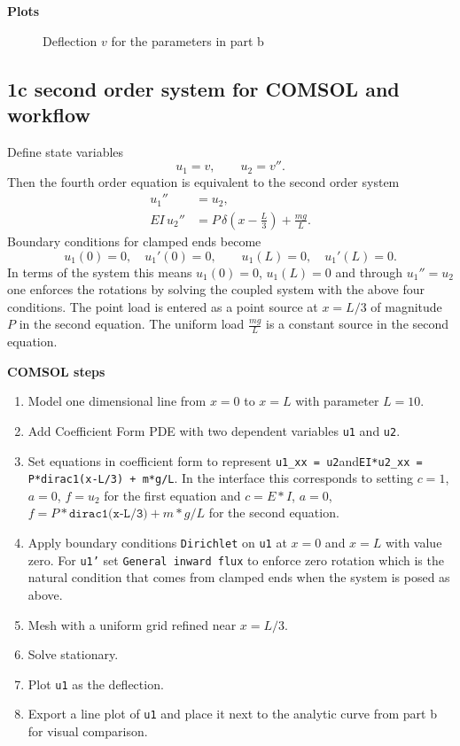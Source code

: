 \documentclass[12pt, a4paper]{article}
\newcommand{\incfig}[1]{%
  \IfFileExists{#1}{\texttt{[image: \#1]}}{%
    \IfFileExists{figs/#1}{\texttt{[image: figs/\#1]}}{%
      \fbox{\rule{0pt}{3cm}\rule{.7\linewidth}{0pt}}}}}
\newcommand{\PlotsHeading}{%
  \FloatBarrier
  \noindent\textbf{Plots}\par\vspace{0.25em}%
}
\begin{document}
\PlotsHeading
\begin{figure}[H]
  \centering
  \incfig{p1b_v.png}
  \caption{Deflection $v$ for the parameters in part b}
\end{figure}
\FloatBarrier

\subsection*{1c  second order system for COMSOL and workflow}

Define state variables
\[
u_{1}=v,\qquad u_{2}=v''.
\]
Then the fourth order equation is equivalent to the second order system
\[
\boxed{
\begin{aligned}
u_{1}'' &= u_{2},\\
E I\,u_{2}'' &= P\,\delta\!\left(x-\frac{L}{3}\right)+\frac{m g}{L}.
\end{aligned}}
\]
Boundary conditions for clamped ends become
\[
u_{1}(0)=0,\quad u_{1}'(0)=0,\qquad
u_{1}(L)=0,\quad u_{1}'(L)=0.
\]
In terms of the system this means $u_{1}(0)=0$, $u_{1}(L)=0$ and through $u_{1}''=u_{2}$ one enforces the rotations by solving the coupled system with the above four conditions.  
The point load is entered as a point source at $x=L/3$ of magnitude $P$ in the second equation. The uniform load $\frac{m g}{L}$ is a constant source in the second equation.

\textbf{COMSOL steps}
\begin{enumerate}
\item Model one dimensional line from $x=0$ to $x=L$ with parameter $L=10$.
\item Add Coefficient Form PDE with two dependent variables \texttt{u1} and \texttt{u2}.
\item Set equations in coefficient form to represent
      \quad \texttt{u1\_xx = u2}\quad and\quad \texttt{EI*u2\_xx = P*dirac1(x-L/3) + m*g/L}.
      In the interface this corresponds to setting $c=1$, $a=0$, $f=u_{2}$ for the first equation and
      $c=E*I$, $a=0$, $f=P*\texttt{dirac1(x-L/3)}+m*g/L$ for the second equation.
\item Apply boundary conditions
      \texttt{Dirichlet} on \texttt{u1} at $x=0$ and $x=L$ with value zero.
      For \texttt{u1'} set \texttt{General inward flux} to enforce zero rotation which is the natural condition that comes from clamped ends when the system is posed as above.
\item Mesh with a uniform grid refined near $x=L/3$.
\item Solve stationary.
\item Plot \texttt{u1} as the deflection.
\item Export a line plot of \texttt{u1} and place it next to the analytic curve from part b for visual comparison.
\end{enumerate}


\printbibliography
\end{document}

